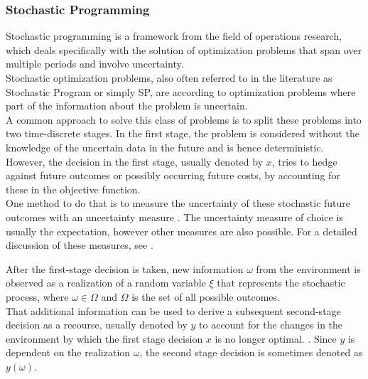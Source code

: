 \subsubsection{Stochastic Programming}\label{Stochastic Programming}
Stochastic programming is a framework from the field of operations research, which deals specifically with the solution of optimization problems that span over multiple periods and involve uncertainty. \\
Stochastic optimization problems, also often referred to in the literature as \glqq Stochastic Program\grqq{} or simply SP, are according to \cite{BirgeLouveaux} optimization problems where part of the information about the problem is uncertain. \\
A common approach to solve this class of problems is to split these problems into two time-discrete stages.
In the first stage, the problem is considered without the knowledge of the uncertain data in the future and is hence deterministic. However, the decision in the first stage, usually denoted by $x$, tries to hedge against future outcomes or possibly occurring future costs, by accounting for these in the objective function. \\
One method to do that is to measure the uncertainty of these stochastic future outcomes with an uncertainty measure \cite{Fuellner_SDDP_TUT}. 
The uncertainty measure of choice is usually the expectation, however other measures are also possible. For a detailed discussion of these measures, see \cite{BirgeLouveaux}.

After the first-stage decision is taken, new information $\omega$ from the environment is observed as a realization of a random variable $\xi$ that represents the stochastic process, where $\omega \in \Omega$ and $\Omega$ is the set of all possible outcomes. \\
That additional information can be used to derive a subsequent second-stage decision as a recourse, usually denoted by $y$ to account for the changes in the environment by which the first stage decision $x$ is no longer optimal. \cite{Fuellner_SDDP_TUT, BirgeLouveaux}.
Since $y$ is dependent on the realization $\omega$, the second stage decision is sometimes denoted as $y(\omega)$.

